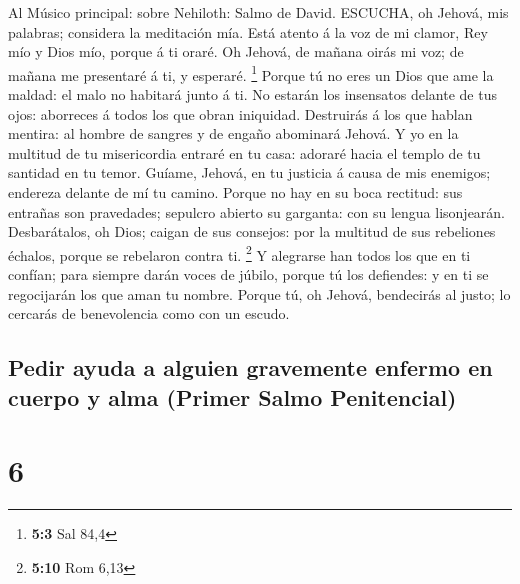  Al Músico principal: sobre Nehiloth: Salmo de David.
ESCUCHA, oh Jehová, mis palabras; considera la meditación mía.
 Está atento á la voz de mi clamor, Rey mío y Dios mío,
porque á ti oraré.  Oh Jehová, de mañana oirás mi voz; de
mañana me presentaré á ti, y esperaré. \footnote{\textbf{5:3} Sal 84,4}
 Porque tú no eres un Dios que ame la maldad: el malo no
habitará junto á ti.  No estarán los insensatos delante de
tus ojos: aborreces á todos los que obran iniquidad. 
Destruirás á los que hablan mentira: al hombre de sangres y de engaño
abominará Jehová.  Y yo en la multitud de tu misericordia
entraré en tu casa: adoraré hacia el templo de tu santidad en tu temor.
 Guíame, Jehová, en tu justicia á causa de mis enemigos;
endereza delante de mí tu camino.  Porque no hay en su boca
rectitud: sus entrañas son pravedades; sepulcro abierto su garganta: con
su lengua lisonjearán.  Desbarátalos, oh Dios; caigan de
sus consejos: por la multitud de sus rebeliones échalos, porque se
rebelaron contra ti. \footnote{\textbf{5:10} Rom 6,13}  Y
alegrarse han todos los que en ti confían; para siempre darán voces de
júbilo, porque tú los defiendes: y en ti se regocijarán los que aman tu
nombre.  Porque tú, oh Jehová, bendecirás al justo; lo
cercarás de benevolencia como con un escudo.

\hypertarget{pedir-ayuda-a-alguien-gravemente-enfermo-en-cuerpo-y-alma-primer-salmo-penitencial}{%
\subsection{Pedir ayuda a alguien gravemente enfermo en cuerpo y alma
(Primer Salmo
Penitencial)}\label{pedir-ayuda-a-alguien-gravemente-enfermo-en-cuerpo-y-alma-primer-salmo-penitencial}}

\hypertarget{section-5}{%
\section{6}\label{section-5}}


